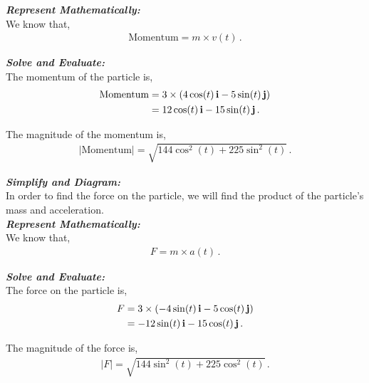 \begin{subquestions}
\begin{subsubquestions}
\textbf{\textit{Represent Mathematically:}} \\
We know that,
\begin{align}
	\text{Momentum} = m \times v(t) \,.
\end{align}




\textbf{\textit{Solve and Evaluate:}} \\
The momentum of the particle is,
\begin{align}
	\text{Momentum} & = 3 \times \left(4\cos(t) \,\mathbf{i} -5\sin(t) \,\mathbf{j}\right) \nonumber \\
	                & = 12\cos(t) \,\mathbf{i} - 15\sin(t)\,\mathbf{j} \,.
\end{align}

The magnitude of the momentum is,
\begin{align}
	|\text{Momentum}| = \sqrt{144\cos^2(t)+225\sin^2(t)} \,.	
\end{align}


\subsubquestion

\textbf{\textit{Simplify and Diagram:}} \\
In order to find the force on the particle, we will find the product of the particle's mass and acceleration.\\




\textbf{\textit{Represent Mathematically:}} \\
We know that,
\begin{align}
	F = m \times a(t) \,.
\end{align}




\textbf{\textit{Solve and Evaluate:}} \\
The force on the particle is,
\begin{align}
	F & = 3 \times \left(-4\sin(t)\,\mathbf{i} - 5\cos(t)\,\mathbf{j}\right) \nonumber \\
	& = -12\sin(t) \,\mathbf{i} - 15\cos(t)\,\mathbf{j} \,.
\end{align}

The magnitude of the force is,
\begin{align}
	|F| = \sqrt{144\sin^2(t)+225\cos^2(t)} \,.	
\end{align}

\end{subsubquestions}

\end{subquestions}